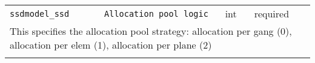 \noindent 
\begin{tabular}{|p{\lpmodwidth}|p{\lpnamewidth}|p{0.5in}|p{0.5in}|}
\cline{1-4}
\texttt{ssdmodel\_ssd} & \texttt{Allocation pool logic} & int & required \\ 
\cline{1-4}
\multicolumn{4}{|p{6in}|}{
This specifies the allocation pool strategy: allocation per gang (0),
allocation per elem (1), allocation per plane (2)
}\\ 
\cline{1-4}
\multicolumn{4}{p{5in}}{}\\
\end{tabular}\\ 
